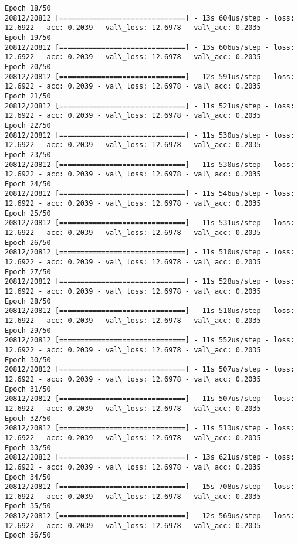 \documentclass[11pt]{article}
\begin{document}
\begin{Verbatim}[commandchars=\\\{\}]
Epoch 18/50
20812/20812 [==============================] - 13s 604us/step - loss: 12.6922 - acc: 0.2039 - val\_loss: 12.6978 - val\_acc: 0.2035
Epoch 19/50
20812/20812 [==============================] - 13s 606us/step - loss: 12.6922 - acc: 0.2039 - val\_loss: 12.6978 - val\_acc: 0.2035
Epoch 20/50
20812/20812 [==============================] - 12s 591us/step - loss: 12.6922 - acc: 0.2039 - val\_loss: 12.6978 - val\_acc: 0.2035
Epoch 21/50
20812/20812 [==============================] - 11s 521us/step - loss: 12.6922 - acc: 0.2039 - val\_loss: 12.6978 - val\_acc: 0.2035
Epoch 22/50
20812/20812 [==============================] - 11s 530us/step - loss: 12.6922 - acc: 0.2039 - val\_loss: 12.6978 - val\_acc: 0.2035
Epoch 23/50
20812/20812 [==============================] - 11s 530us/step - loss: 12.6922 - acc: 0.2039 - val\_loss: 12.6978 - val\_acc: 0.2035
Epoch 24/50
20812/20812 [==============================] - 11s 546us/step - loss: 12.6922 - acc: 0.2039 - val\_loss: 12.6978 - val\_acc: 0.2035
Epoch 25/50
20812/20812 [==============================] - 11s 531us/step - loss: 12.6922 - acc: 0.2039 - val\_loss: 12.6978 - val\_acc: 0.2035
Epoch 26/50
20812/20812 [==============================] - 11s 510us/step - loss: 12.6922 - acc: 0.2039 - val\_loss: 12.6978 - val\_acc: 0.2035
Epoch 27/50
20812/20812 [==============================] - 11s 528us/step - loss: 12.6922 - acc: 0.2039 - val\_loss: 12.6978 - val\_acc: 0.2035
Epoch 28/50
20812/20812 [==============================] - 11s 510us/step - loss: 12.6922 - acc: 0.2039 - val\_loss: 12.6978 - val\_acc: 0.2035
Epoch 29/50
20812/20812 [==============================] - 11s 552us/step - loss: 12.6922 - acc: 0.2039 - val\_loss: 12.6978 - val\_acc: 0.2035
Epoch 30/50
20812/20812 [==============================] - 11s 507us/step - loss: 12.6922 - acc: 0.2039 - val\_loss: 12.6978 - val\_acc: 0.2035
Epoch 31/50
20812/20812 [==============================] - 11s 507us/step - loss: 12.6922 - acc: 0.2039 - val\_loss: 12.6978 - val\_acc: 0.2035
Epoch 32/50
20812/20812 [==============================] - 11s 513us/step - loss: 12.6922 - acc: 0.2039 - val\_loss: 12.6978 - val\_acc: 0.2035
Epoch 33/50
20812/20812 [==============================] - 13s 621us/step - loss: 12.6922 - acc: 0.2039 - val\_loss: 12.6978 - val\_acc: 0.2035
Epoch 34/50
20812/20812 [==============================] - 15s 708us/step - loss: 12.6922 - acc: 0.2039 - val\_loss: 12.6978 - val\_acc: 0.2035
Epoch 35/50
20812/20812 [==============================] - 12s 569us/step - loss: 12.6922 - acc: 0.2039 - val\_loss: 12.6978 - val\_acc: 0.2035
Epoch 36/50

\end{Verbatim}
\end{document}
